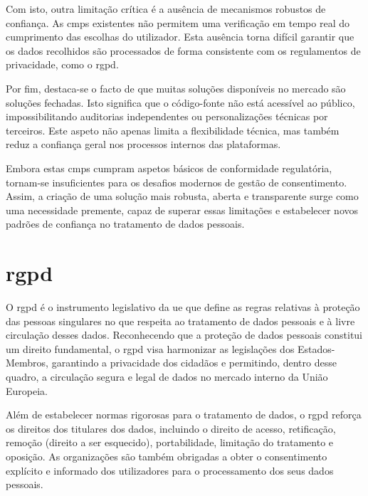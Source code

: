 Com isto, outra limitação crítica é a ausência de mecanismos robustos de confiança. As \acrshort{cmp}s existentes não permitem uma verificação em tempo real do cumprimento das escolhas do utilizador. Esta ausência torna difícil garantir que os dados recolhidos são processados de forma consistente com os regulamentos de privacidade, como o \acrshort{rgpd}.

Por fim, destaca-se o facto de que muitas soluções disponíveis no mercado são soluções fechadas. Isto significa que o código-fonte não está acessível ao público, impossibilitando auditorias independentes ou personalizações técnicas por terceiros. Este aspeto não apenas limita a flexibilidade técnica, mas também reduz a confiança geral nos processos internos das plataformas.

Embora estas \acrshort{cmp}s cumpram aspetos básicos de conformidade regulatória, tornam-se insuficientes para os desafios modernos de gestão de consentimento. Assim, a criação de uma solução mais robusta, aberta e transparente surge como uma necessidade premente, capaz de superar essas limitações e estabelecer novos padrões de confiança no tratamento de dados pessoais.


\section{\acrfull{rgpd}}

O \acrshort{rgpd} é o instrumento legislativo da \acrfull{ue} que define as regras relativas à proteção das pessoas singulares no que respeita ao tratamento de dados pessoais e à livre circulação desses dados. Reconhecendo que a proteção de dados pessoais constitui um direito fundamental, o \acrshort{rgpd} visa harmonizar as legislações dos Estados-Membros, garantindo a privacidade dos cidadãos e permitindo, dentro desse quadro, a circulação segura e legal de dados no mercado interno da União Europeia.

Além de estabelecer normas rigorosas para o tratamento de dados, o \acrshort{rgpd} reforça os direitos dos titulares dos dados, incluindo o direito de acesso, retificação, remoção (direito a ser esquecido), portabilidade, limitação do tratamento e oposição. As organizações são também obrigadas a obter o consentimento explícito e informado dos utilizadores para o processamento dos seus dados pessoais. \citep{Daudén-Esmel2024}

